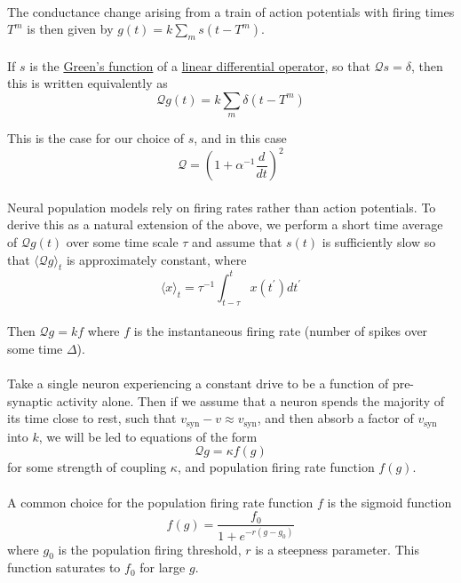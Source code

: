 \documentclass{article}
\begin{document}
\paragraph{}
The conductance change arising from a train of action potentials with firing times $T^{m}$ is then given by $g(t) = k \sum\limits_{m} s( t - T^{m} )$.

\paragraph{}
If $s$ is the \underline{Green's function} of a \underline{linear differential operator}, so that $\mathcal{Q}s=\delta$, then this is written equivalently as 
\[ \mathcal{Q} g(t) = k \sum\limits_{m} \delta( t - T^{m} ) \]

This is the case for our choice of $s$, and in this case
\[ \mathcal{Q} = \left( 1 + \alpha^{-1} \frac{d}{dt} \right)^{2} \]

\paragraph{}
Neural population models rely on firing rates rather than action potentials. To derive this as a natural extension of the above, we perform a short time average of $\mathcal{Q}g(t)$ over some time scale $\tau$ and assume that $s(t)$ is sufficiently slow so that $\langle\mathcal{Q}g\rangle_{t}$ is approximately constant, where 
\[ \langle x \rangle_{t} = \tau^{-1}\int_{t-\tau}^{t} x( t^{\prime} ) dt^{\prime} \]

\paragraph{}
Then $\mathcal{Q}g = kf$ where $f$ is the instantaneous firing rate (number of spikes over some time $\Delta$).

\paragraph{}
Take a single neuron experiencing a constant drive to be a function of pre-synaptic activity alone. Then if we assume that a neuron spends the majority of its time close to rest, such that $v_{\text{syn}} - v \approx v_{\text{syn}}$, and then absorb a factor of $v_{\text{syn}}$ into $k$, we will be led to equations of the form 
\[ \mathcal{Q}g = \kappa f(g) \]
for some strength of coupling $\kappa$, and population firing rate function $f(g)$.

\paragraph{}
A common choice for the population firing rate function $f$ is the sigmoid function
\[ f(g) = \frac{f_{0}}{1 + e^{-r(g-g_{0})}} \]
where $g_{0}$ is the population firing threshold, $r$ is a steepness parameter. This function saturates to $f_{0}$ for large $g$.
\end{document}
